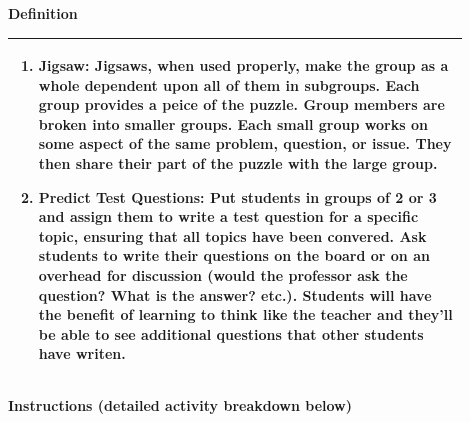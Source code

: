 \documentclass{article}
\begin{document}
{\large\textbf{Definition}}\\
\noindent
\begin{tabular}{|p{0.9\linewidth}|}
\hline
\begin{enumerate}[label=\alph*.]
    \item\textbf{Jigsaw:} Jigsaws, when used properly, make the group as a whole dependent upon all of them in subgroups. Each group provides a peice of the puzzle. Group members are broken into smaller groups. Each small group works on some aspect of the same problem, question, or issue. They then share their part of the puzzle with the large group.
    \item\textbf{Predict Test Questions:}  Put students in groups of 2 or 3 and assign them to write a test question for a specific topic, ensuring that all topics have been convered. Ask students to write their questions on the board or on an overhead for discussion (would the professor ask the question? What is the answer? etc.). Students will have the benefit of learning to think like the teacher and they'll be able to see additional questions that other students have writen.
 
\end{enumerate} \\
\hline
\end{tabular}
\newpage

\vspace{0.5cm}
\noindent
{\large \textbf{Instructions (detailed activity breakdown below)}} \\
\end{document}
